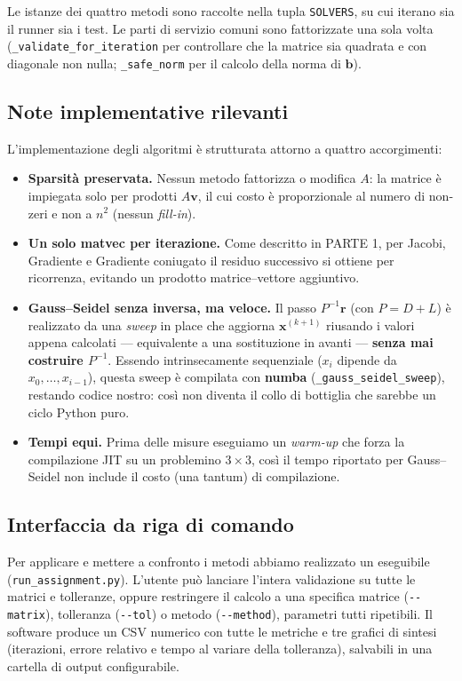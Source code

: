 \documentclass[11pt,a4paper]{article}
\begin{document}
Le istanze dei quattro metodi sono raccolte nella tupla \texttt{SOLVERS}, su cui
iterano sia il runner sia i test. Le parti di servizio comuni sono fattorizzate
una sola volta (\texttt{\_validate\_for\_iteration} per controllare che la matrice
sia quadrata e con diagonale non nulla; \texttt{\_safe\_norm} per il calcolo della
norma di $\mathbf{b}$).

\subsection{Note implementative rilevanti}
L'implementazione degli algoritmi è strutturata attorno a quattro accorgimenti:
\begin{itemize}[leftmargin=1.6em]
  \item \textbf{Sparsità preservata.} Nessun metodo fattorizza o modifica $A$: la
  matrice è impiegata solo per prodotti $A\mathbf{v}$, il cui costo è
  proporzionale al numero di non-zeri e non a $n^2$ (nessun \emph{fill-in}).

  \item \textbf{Un solo matvec per iterazione.} Come descritto in PARTE 1, per
  Jacobi, Gradiente e Gradiente coniugato il residuo successivo si ottiene per
  ricorrenza, evitando un prodotto matrice--vettore aggiuntivo.

  \item \textbf{Gauss--Seidel senza inversa, ma veloce.} Il passo
  $P^{-1}\mathbf{r}$ (con $P=D+L$) è realizzato da una \emph{sweep} in place che
  aggiorna $\mathbf{x}^{(k+1)}$ riusando i valori appena calcolati --- equivalente
  a una sostituzione in avanti --- \textbf{senza mai costruire $P^{-1}$}. Essendo
  intrinsecamente sequenziale ($x_i$ dipende da $x_0,\dots,x_{i-1}$), questa sweep
  è compilata con \textbf{numba} (\texttt{\_gauss\_seidel\_sweep}), restando
  codice nostro: così non diventa il collo di bottiglia che sarebbe un ciclo
  Python puro.

  \item \textbf{Tempi equi.} Prima delle misure eseguiamo un \emph{warm-up} che
  forza la compilazione JIT su un problemino $3\times3$, così il tempo riportato
  per Gauss--Seidel non include il costo (una tantum) di compilazione.
\end{itemize}

\subsection{Interfaccia da riga di comando}
Per applicare e mettere a confronto i metodi abbiamo realizzato un eseguibile
(\texttt{run\_assignment.py}). L'utente può lanciare l'intera validazione su tutte
le matrici e tolleranze, oppure restringere il calcolo a una specifica matrice
(\texttt{-{}-matrix}), tolleranza (\texttt{-{}-tol}) o metodo
(\texttt{-{}-method}), parametri tutti ripetibili. Il software produce un CSV
numerico con tutte le metriche e tre grafici di sintesi (iterazioni, errore
relativo e tempo al variare della tolleranza), salvabili in una cartella di
output configurabile.
\end{document}
